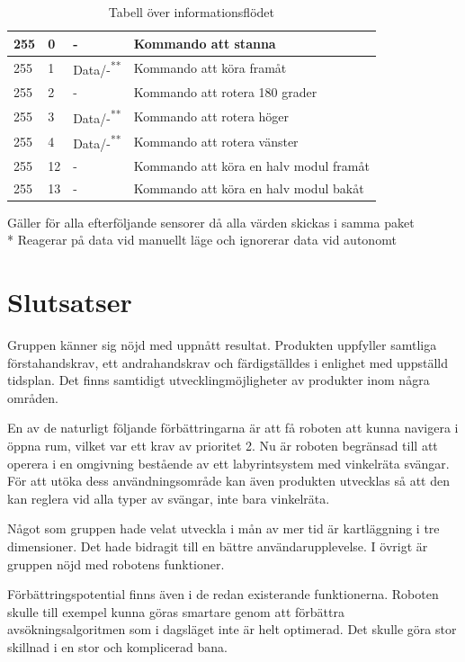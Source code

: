\documentclass[11pt]{article}
\begin{document}
\begin{flushleft}
\begin{table}[H]
\begin{tabular}{|p{6em}|p{1em}|p{6em}|p{22em}|} \hline

255 & 0 & - & Kommando att stanna \\ \hline
255 & 1 & Data/-\textsuperscript{**}   & Kommando att köra framåt \\ \hline
255 & 2 & - & Kommando att rotera 180 grader\\ \hline
255 & 3 & Data/-\textsuperscript{**}    & Kommando att rotera höger \\ \hline
255 & 4 & Data/-\textsuperscript{**}    & Kommando att rotera vänster \\ \hline
255 & 12 & - & Kommando att köra en halv modul framåt\\ \hline
255 & 13 & - & Kommando att köra en halv modul bakåt \\ \hline
\end{tabular}

\text{*} Gäller för alla efterföljande sensorer då alla värden skickas i samma paket \\*
\text{**} Reagerar på data vid manuellt läge och ignorerar data vid autonomt

\caption{Tabell över informationsflödet} \label{tab}
\end{table}

\pagebreak
\section{Slutsatser}

Gruppen känner sig nöjd med uppnått resultat. Produkten uppfyller samtliga förstahandskrav, ett andrahandskrav och färdigställdes i enlighet med uppställd tidsplan. Det finns samtidigt utvecklingmöjligheter av produkter inom några områden. 

En av de naturligt följande förbättringarna är att få roboten att kunna navigera i öppna rum, vilket var ett krav av prioritet 2. Nu är roboten begränsad till att operera i en omgivning bestående av ett labyrintsystem med vinkelräta svängar. För att utöka dess användningsområde kan även produkten utvecklas så att den kan reglera vid alla typer av svängar, inte bara vinkelräta.

Något som gruppen hade velat utveckla i mån av mer tid är kartläggning i tre dimensioner. Det hade bidragit till en bättre användarupplevelse. I övrigt är gruppen nöjd med robotens funktioner. 

Förbättringspotential finns även i de redan existerande funktionerna. Roboten skulle till exempel kunna göras smartare genom att förbättra avsökningsalgoritmen som i dagsläget inte är helt optimerad. Det skulle göra stor skillnad i en stor och komplicerad bana. 
\pagebreak



\end{flushleft}
\end{document}
